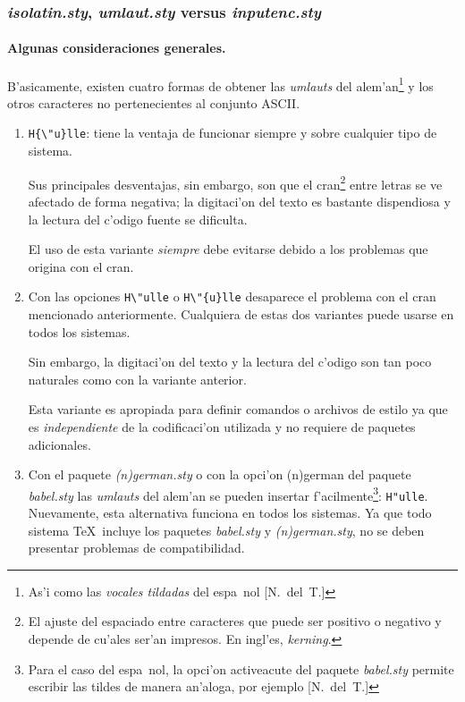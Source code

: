 \documentclass[11pt,a4paper,pagesize,tablecaptionabove,abstracton,pointlessnumbers]{scrartcl}
\newcommand{\Paket}[1]{\textsf{\textsl{#1.sty}}\xspace}
\newcommand{\Option}[1]{\textsf{#1}\xspace}
\newcommand{\NDT}{[N.~del~T.]}
\begin{document}
\subsubsection{\Paket{isolatin}, \Paket{umlaut} versus \Paket{inputenc}}
\label{sec:eingabe-von-umlauten}

\paragraph{Algunas consideraciones generales.}
\label{sec:generelles}

B'asicamente, existen cuatro formas de obtener las \emph{umlauts} del alem'an\footnote{As'i como las \emph{vocales tildadas} del espa~nol \NDT} y los otros caracteres no pertenecientes al conjunto ASCII.

\begin{enumerate}
  \item \verb+H{\"u}lle+: tiene la ventaja de funcionar siempre y sobre cualquier tipo de sistema.
  
  Sus principales desventajas, sin embargo, son que el cran\footnote{El ajuste del espaciado entre caracteres que puede ser positivo o negativo y depende de cu'ales ser'an impresos. En ingl'es, \textit{kerning}.} entre letras se ve afectado de forma negativa; la digitaci'on del texto es bastante dispendiosa y la lectura del c'odigo fuente se dificulta.
  
  El uso de esta variante \emph{siempre} debe evitarse debido a los problemas que origina con el cran.
  
  \item Con las opciones \verb+H\"ulle+ o \verb+H\"{u}lle+ desaparece el problema con el cran mencionado anteriormente. Cualquiera de estas dos variantes puede usarse en todos los sistemas.
  
  Sin embargo, la digitaci'on del texto y la lectura del c'odigo son tan poco naturales como con la variante anterior.
  
  Esta variante es apropiada para definir comandos o archivos de estilo ya que es \emph{independiente} de la codificaci'on utilizada y no requiere de paquetes adicionales.\label{item:die-eingabe-der}
  
  \item Con el paquete \Paket{(n)german} o con la opci'on \Option{(n)german} del paquete \Paket{babel} las \textit{umlauts} del alem'an se pueden insertar f'acilmente\footnote{Para el caso del espa~nol, la opci'on \Option{activeacute} del paquete \Paket{babel} permite escribir las tildes de manera an'aloga, por ejemplo  \NDT}: \verb+H"ulle+. Nuevamente, esta alternativa funciona en todos los sistemas. Ya que todo sistema \TeX\ incluye los paquetes \Paket{babel} y \Paket{(n)german}, no se deben presentar problemas de compatibilidad.


\end{enumerate}
\end{document}
